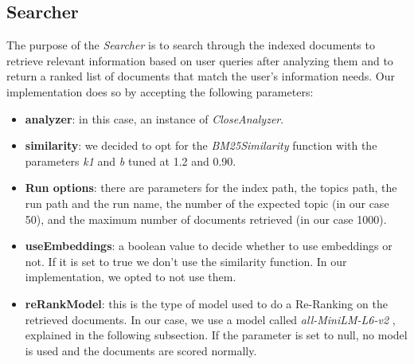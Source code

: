 \subsection{Searcher} \label{searcher_subsec}
The purpose of the \textit{Searcher} is to search through the indexed documents to retrieve relevant information based on user queries after analyzing them and to
return a ranked list of documents that match the user’s information needs.
\newline
Our implementation does so by accepting the following parameters:
\begin{itemize}
  \item \textbf{analyzer}: in this case, an instance of \textit{CloseAnalyzer}.
  \item \textbf{similarity}: we decided to opt for the \textit{BM25Similarity} \cite{lucenebm25similarity} function with the parameters \textit{k1} and \textit{b} tuned at 1.2 and 0.90.
  \item \textbf{Run options}: there are parameters for the index path, the topics path, the run path and the run name, the number of the expected topic (in our case 50), and the maximum number of documents retrieved (in our case 1000).
  \item \textbf{useEmbeddings}: a boolean value to decide whether to use embeddings or not. 
  If it is set to true we don't use the similarity function. In our implementation, we opted to not use them.
  \item \textbf{reRankModel}: this is the type of model used to do a Re-Ranking on the retrieved documents. 
  In our case, we use a model called \textit{all-MiniLM-L6-v2} \cite{huggingfaceallminilml6v2}, explained in the following subsection. 
  If the parameter is set to null, no model is used and the documents are scored normally.
\end{itemize}

